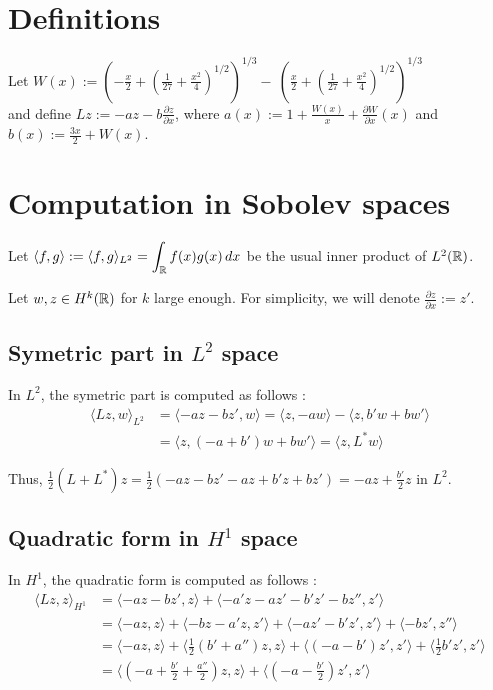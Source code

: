\documentclass[11pt,a4paper]{article}
\begin{document}
\section{Definitions}

Let $W(x) := \left( -\frac{x}{2} + \left( \frac{1}{27} + \frac{x^2}{4} \right)^{1/2} \right)^{1/3} -\  \left( \frac{x}{2} + \left( \frac{1}{27} + \frac{x^2}{4} \right)^{1/2} \right)^{1/3}$ \\


and define $Lz := -az - b\frac{\partial z}{\partial x} $, where $a(x):= 1+\frac{W(x)}{x}+\frac{\partial W}{\partial x} (x)$ and $b(x):= \frac{3x}{2} + W(x)$.

\section{Computation in Sobolev spaces}

Let $\langle f, g \rangle := \langle f, g \rangle_{L^2} = \displaystyle \int_\mathbb R  f(x)g(x)\,dx$ be the usual inner product of $L^2(\mathbb R)$.

Let $w,z \in H^k(\mathbb R)$ for $k$ large enough. For simplicity, we will denote $\frac{\partial z}{\partial x} := z'$.

\subsection{Symetric part in $L^2$ space}
In $L^2$, the symetric part is computed as follows :
\begin{align*}
  \langle Lz, w \rangle_{L^2}  &=   \langle -az - bz', w \rangle =  \langle z, -aw \rangle  -   \langle z, b'w+bw' \rangle    \\
                  &= \langle z, (-a+b')w + bw' \rangle = \langle z, L^*w \rangle
\end{align*}

Thus, $\frac{1}{2}(L+L^*)z = \frac{1}{2}(-az-bz' -az +b'z+bz') \displaystyle =-az+\frac{b'}{2}z$ in $L^2$.

\subsection{Quadratic form in $H^1$ space}
In $H^1$, the quadratic form is computed as follows :
\begin{align*}
  \langle Lz, z \rangle_{H^1}   &=   \langle -az - bz', z \rangle +  \langle -a'z-az' - b'z'-bz'', z' \rangle \\
  &=  \langle -az, z \rangle + \langle -bz - a'z, z' \rangle + \langle - az'-b'z', z' \rangle + \langle - bz', z'' \rangle \\
  &=  \langle -az, z \rangle + \langle \frac{1}{2}(b'+a'')z, z \rangle + \langle (-a-b')z', z' \rangle + \langle \frac{1}{2} b' z', z' \rangle \\
  &=  \langle (-a+ \frac{b'}{2}+\frac{a''}{2})z, z \rangle +  \langle (-a-\frac{b'}{2})z', z' \rangle 
\end{align*}
\end{document}
